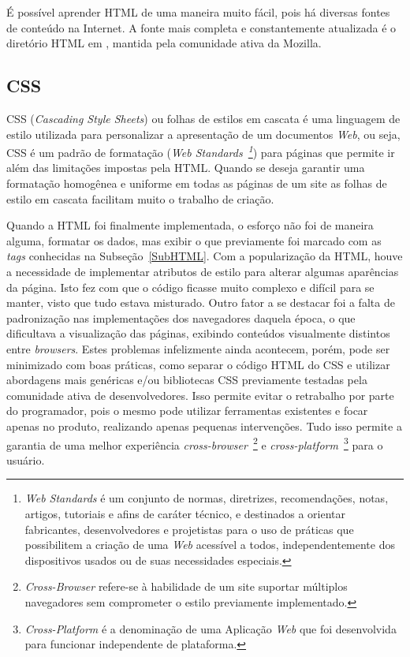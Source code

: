 É possível aprender HTML de uma maneira muito fácil, pois há diversas fontes de conteúdo na Internet. A fonte mais completa e constantemente atualizada é o diretório HTML em \textit{}, mantida pela comunidade ativa da Mozilla.
%
%
%
\subsection{CSS}
\label{SubCSS}

CSS (\textit{Cascading Style Sheets}) ou folhas de estilos em cascata é uma linguagem de estilo utilizada para personalizar a apresentação de um documentos \textit{Web}, ou seja, CSS é um padrão de formatação (\textit{Web Standards~\footnote{\textit{Web Standards} é um conjunto de normas, diretrizes, recomendações, notas, artigos, tutoriais e afins de caráter técnico, e destinados a orientar fabricantes, desenvolvedores e projetistas para o uso de práticas que possibilitem a criação de uma \textit{Web} acessível a todos, independentemente dos dispositivos usados ou de suas necessidades especiais.}}) para páginas que permite ir além das limitações impostas pela HTML. Quando se deseja garantir uma formatação homogênea e uniforme em todas as páginas de um site as folhas de estilo em cascata facilitam muito o trabalho de criação.

Quando a HTML foi finalmente implementada, o esforço não foi de maneira alguma, formatar os dados, mas exibir o que previamente foi marcado com as \textit{tags} conhecidas na Subseção~\ref{SubHTML}. Com a popularização da HTML, houve a necessidade de implementar atributos de estilo para alterar algumas aparências da página. Isto fez com que o código ficasse muito complexo e difícil para se manter, visto que tudo estava misturado. Outro fator a se destacar foi a falta de padronização nas implementações dos navegadores daquela época, o que dificultava a visualização das páginas, exibindo conteúdos visualmente distintos entre \textit{browsers}. Estes problemas infelizmente ainda acontecem, porém, pode ser minimizado com boas práticas, como separar o código HTML do CSS e utilizar abordagens mais genéricas e/ou bibliotecas CSS previamente testadas pela comunidade ativa de desenvolvedores. Isso permite evitar o retrabalho por parte do programador, pois o mesmo pode utilizar ferramentas existentes e focar apenas no produto, realizando apenas pequenas intervenções. Tudo isso permite a garantia de uma melhor experiência \textit{cross-browser}~\footnote{\textit{Cross-Browser} refere-se à habilidade de um site suportar múltiplos navegadores sem comprometer o estilo previamente implementado.} e \textit{cross-platform}~\footnote{\textit{Cross-Platform} é a denominação de uma Aplicação \textit{Web} que foi desenvolvida para funcionar independente de plataforma.} para o usuário.

